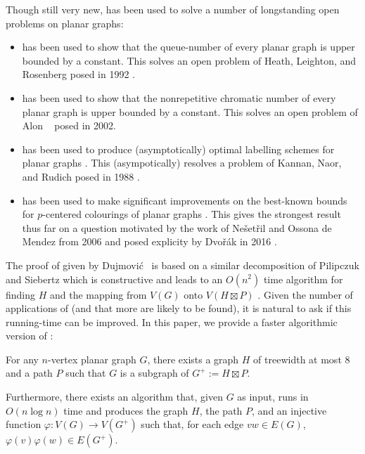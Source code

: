\documentclass[kpfonts]{patmorin}
\begin{document}
Though still very new,  has been used to solve a number of longstanding open problems on planar graphs:
\begin{itemize}
  \item {} has been used to show that the queue-number of every planar graph is upper bounded by a constant.  This solves an open problem of Heath, Leighton, and Rosenberg posed in 1992 \cite{heath.leighton.ea:comparing}.
  \item {} has been used to show that the nonrepetitive chromatic number of every planar graph is upper bounded by a constant. This solves an open problem of Alon \etal\  \cite{alon.grytczuk.ea:nonrepetitive} posed in 2002.
  \item {} has been used to produce (asymptotically) optimal labelling schemes for planar graphs \cite{dujmovic.esperet.ea:adjacency}.  This (asympotically) resolves a problem of Kannan, Naor, and Rudich posed in 1988 \cite{kannan.naor.ea:implicit-stoc,kannan.naor.ea:implicit}.
  \item {} has been used to make significant improvements on the best-known bounds for $p$-centered colourings of planar graphs \cite{debski.felsner.ea:improved}.  This gives the strongest result thus far on a question motivated by the work of Nešetřil and Ossona de Mendez from 2006 \cite{nesetril.ossona:tree,nesetril.ossona:grad} and posed explicity by Dvořák in 2016 \cite{dvorak:question}.
\end{itemize}

The proof of  given by Dujmović \etal\  is based on a similar decomposition of Pilipczuk and Siebertz \cite{pilipczuk.siebertz:polynomial-soda} which is constructive and leads to an $O(n^2)$ time algorithm for finding $H$ and the mapping from $V(G)$ onto $V(H\boxtimes P)$ \cite[Section~10]{dujmovic.joret.ea:planar}. Given the number of applications of  (and that more are likely to be found), it is natural to ask if this running-time can be improved.  In this paper, we provide a faster algorithmic version of :

\begin{thm}
  For any $n$-vertex planar graph $G$, there exists a graph $H$ of treewidth at most 8 and a path $P$ such that $G$ is a subgraph of $G^+:=H\boxtimes P$.

  Furthermore, there exists an algorithm that, given $G$ as input, runs in $O(n\log n)$ time and produces the graph $H$, the path $P$, and an injective function $\varphi:V(G)\to V(G^+)$ such that, for each edge $vw\in E(G)$,  $\varphi(v)\varphi(w)\in E(G^+)$.
\end{thm}
\end{document}
